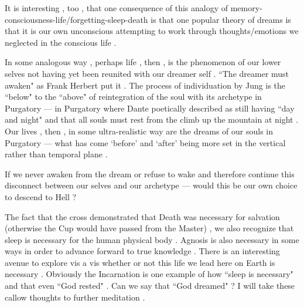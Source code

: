 \begin{footnotesize}
\begin{sffamily}
It is interesting , too , that one consequence of this analogy of memory-consciousness-life/forgetting-sleep-death is that one popular theory of dreams is that it is our own unconscious attempting to work through thoughts/emotions we neglected in the conscious life .

In some analogous way , perhaps life , then , is the phenomenon of our lower selves not having yet been reunited with our dreamer self . ``The dreamer must awaken" as Frank Herbert put it . The process of individuation by Jung is the ``below" to the ``above" of reintegration of the soul with its archetype in Purgatory — in Purgatory where Dante poetically described as still having ``day and night" and that all souls must rest from the climb up the mountain at night . Our lives , then , in some ultra-realistic way are the dreams of our souls in Purgatory — what has come `before' and `after' being more set in the vertical rather than temporal plane .

If we never awaken from the dream or refuse to wake and therefore continue this disconnect between our selves and our archetype — would this be our own choice to descend to Hell ?

The fact that the cross demonstrated that Death was necessary for salvation (otherwise the Cup would have passed from the Master) , we also recognize that sleep is necessary for the human physical body . Agnosis is also necessary in some ways in order to advance forward to true knowledge . There is an interesting avenue to explore vis a vis whether or not this life we lead here on Earth is necessary . Obviously the Incarnation is one example of how ``sleep is necessary" and that even ``God rested" . Can we say that ``God dreamed" ? I will take these callow thoughts to further meditation .


\end{sffamily}\end{footnotesize}
